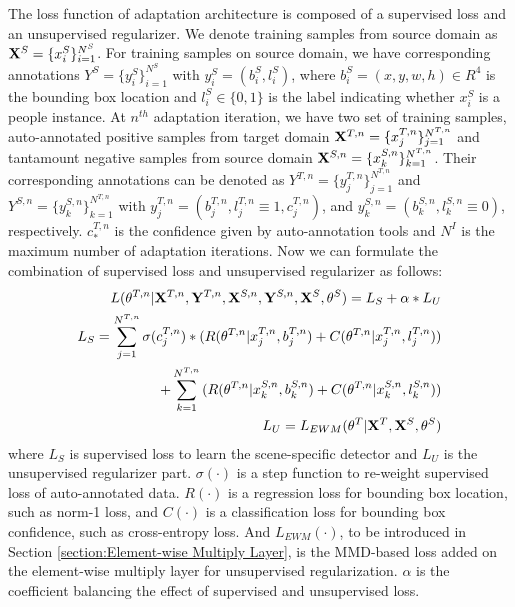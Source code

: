 \documentclass[runningheads]{llncs}
\begin{document}
The loss function of adaptation architecture is composed of a supervised loss and an unsupervised regularizer. We denote training samples from source domain as ${\bf X}^{S} = \{x^{S}_{i}\}^{N^{S}}_{i=1}$. For training samples on source domain, we have corresponding annotations $Y^{S} = \{y^{S}_{i}\}^{N^{S}}_{i=1}$ with $y^{S}_{i} = (b^{S}_{i},l^{S}_{i})$, where $b^{S}_{i} = (x,y,w,h) \in R^{4}$ is the bounding box location and $l^{S}_{i} \in \{0,1\}$ is the label indicating whether $x^{S}_{i}$ is a people instance. At $n^{th}$ adaptation iteration, we have two set of training samples, auto-annotated positive samples from target domain ${\bf X}^{T,n} = \{x^{T,n}_{j}\}^{N^{T,n}}_{j=1}$ and tantamount negative samples from source domain ${\bf X}^{S,n} = \{x^{S,n}_{k}\}^{N^{T,n}}_{k=1}$. Their corresponding annotations can be denoted as $Y^{T,n} = \{y^{T,n}_{j}\}^{N^{T,n}}_{j=1}$ and $Y^{S,n} = \{y^{S,n}_{k}\}^{N^{T,n}}_{k=1}$ with $y^{T,n}_{j} = (b^{T,n}_{j},l^{T,n}_{j}\equiv1,c^{T,n}_{j})$, and $y^{S,n}_{k} = (b^{S,n}_{k},l^{S,n}_{k}\equiv0)$, respectively. $c^{T,n}_{*}$ is the confidence given by auto-annotation tools and $N^{I}$ is the maximum number of adaptation iterations. Now we can formulate the combination of supervised loss and unsupervised regularizer as follows:
\begin{eqnarray}
  L(\theta^{T,n}|{\bf X}^{T,n},{\bf Y}^{T,n},{\bf X}^{S,n},{\bf Y}^{S,n},{\bf X}^{S},\theta^{S}) = L_{S} + \alpha * L_{U} \\
 \nonumber  L_{S} = \sum^{N^{T,n}}_{j=1}{\sigma(c^{T,n}_{j})* ( R(\theta^{T,n}|x^{T,n}_{j},b^{T,n}_{j})+C(\theta^{T,n}|x^{T,n}_{j},l^{T,n}_{j}) )} \\
             + \sum^{N^{T,n}}_{k=1}{( R(\theta^{T,n}|x^{S,n}_{k},b^{S,n}_{k})+C(\theta^{T,n}|x^{S,n}_{k},l^{S,n}_{k}) )}\\
  L_{U} = L_{EWM}(\theta^{T}|{\bf X}^{T},{\bf X}^{S},\theta^{S}) \label{Eq:lmmd}
\end{eqnarray}
where $L_{S}$ is supervised loss to learn the scene-specific detector and $L_{U}$ is the unsupervised regularizer part. $\sigma(\cdot)$ is a step function to re-weight supervised loss of auto-annotated data. $R(\cdot)$ is a regression loss for bounding box location, such as norm-1 loss, and $C(\cdot)$ is a classification loss for bounding box confidence, such as cross-entropy loss. And $L_{EWM}(\cdot)$, to be introduced in Section \ref{section:Element-wise Multiply Layer}, is the MMD-based loss added on the element-wise multiply layer for unsupervised regularization. $\alpha$ is the coefficient balancing the effect of supervised and unsupervised loss.
\end{document}
